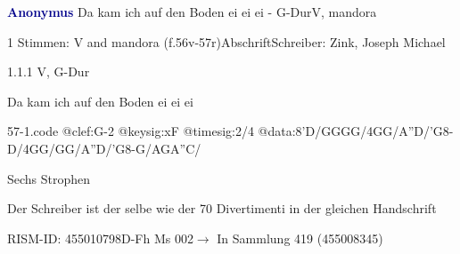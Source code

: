\documentclass[twocolumn]{book}
\begin{document}
\par \vspace{7pt} \textcolor{darkblue}{\textbf{Anonymus  }}\hfillplus{\textbf{[57]}}\newline Da kam ich auf den Boden ei ei ei - G-Dur\newline V, mandora
\par \begin{itshape}\end{itshape} 
\par \textcolor{darkblue}{}  1 Stimmen: V and mandora  (f.56v-57r)\newline Abschrift\newline Schreiber: Zink, Joseph Michael
\par 1.1.1  V, G-Dur\newline \begin{footnotesize} Da kam ich auf den Boden ei ei ei \end{footnotesize}  
\begin{filecontents*}{57-1.code}
@clef:G-2
@keysig:xF
@timesig:2/4
@data:8'D/GGGG/4GG/A''D/'G8-D/4GG/GG/A''D/'G8-G/AGA''C/
\end{filecontents*}
\newline
%
\par Sechs Strophen
\par Der Schreiber ist der selbe wie der 70 Divertimenti in der gleichen Handschrift
\par RISM-ID: 455010798\newline D-Fh  Ms 002\newline $\rightarrow$ In Sammlung 419 (455008345)
      
\end{document}
